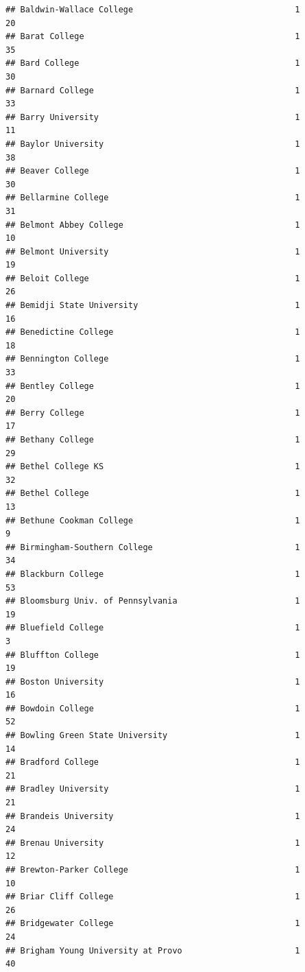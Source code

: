\documentclass[
]{article}
\begin{document}
\begin{verbatim}
## Baldwin-Wallace College                                 1          20
## Barat College                                           1          35
## Bard College                                            1          30
## Barnard College                                         1          33
## Barry University                                        1          11
## Baylor University                                       1          38
## Beaver College                                          1          30
## Bellarmine College                                      1          31
## Belmont Abbey College                                   1          10
## Belmont University                                      1          19
## Beloit College                                          1          26
## Bemidji State University                                1          16
## Benedictine College                                     1          18
## Bennington College                                      1          33
## Bentley College                                         1          20
## Berry College                                           1          17
## Bethany College                                         1          29
## Bethel College KS                                       1          32
## Bethel College                                          1          13
## Bethune Cookman College                                 1           9
## Birmingham-Southern College                             1          34
## Blackburn College                                       1          53
## Bloomsburg Univ. of Pennsylvania                        1          19
## Bluefield College                                       1           3
## Bluffton College                                        1          19
## Boston University                                       1          16
## Bowdoin College                                         1          52
## Bowling Green State University                          1          14
## Bradford College                                        1          21
## Bradley University                                      1          21
## Brandeis University                                     1          24
## Brenau University                                       1          12
## Brewton-Parker College                                  1          10
## Briar Cliff College                                     1          26
## Bridgewater College                                     1          24
## Brigham Young University at Provo                       1          40

\end{verbatim}
\end{document}
